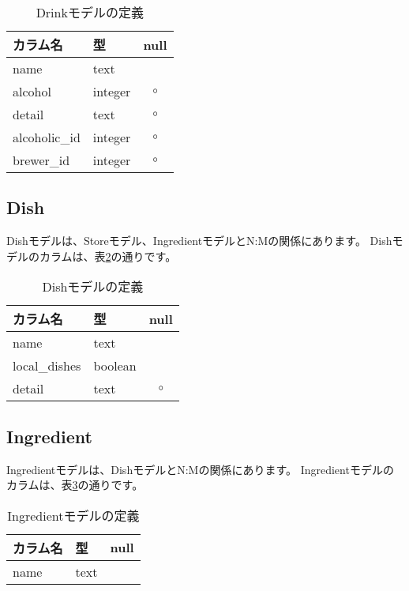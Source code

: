 \documentclass[a4j,titlepage]{jarticle}
\begin{document}
\begin{table}[!htbp]
\caption{Drinkモデルの定義}
\label{drink}
\small
\begin{center}
\begin{tabular}{|l|l|c|}\hline
カラム名 & 型 & null \\\hline\hline
name & text & \\\hline
alcohol & integer & $\circ$ \\\hline
detail & text & $\circ$ \\\hline
alcoholic\_id & integer & $\circ$ \\\hline
brewer\_id & integer & $\circ$ \\\hline
\end{tabular}
\end{center}
\end{table}

\subsection{Dish}
Dishモデルは、Storeモデル、IngredientモデルとN:Mの関係にあります。
Dishモデルのカラムは、表\ref{dish}の通りです。

\begin{table}[!htbp]
\caption{Dishモデルの定義}
\label{dish}
\small
\begin{center}
\begin{tabular}{|l|l|c|}\hline
カラム名 & 型 & null \\\hline\hline
name & text & \\\hline
local\_dishes & boolean & \\\hline
detail & text & $\circ$ \\\hline
\end{tabular}
\end{center}
\end{table}

\subsection{Ingredient}
Ingredientモデルは、DishモデルとN:Mの関係にあります。
Ingredientモデルのカラムは、表\ref{ingredient}の通りです。

\begin{table}[!htbp]
\caption{Ingredientモデルの定義}
\label{ingredient}
\small
\begin{center}
\begin{tabular}{|l|l|c|}\hline
カラム名 & 型 & null \\\hline\hline
name & text & \\\hline
\end{tabular}
\end{center}
\end{table}
\end{document}
